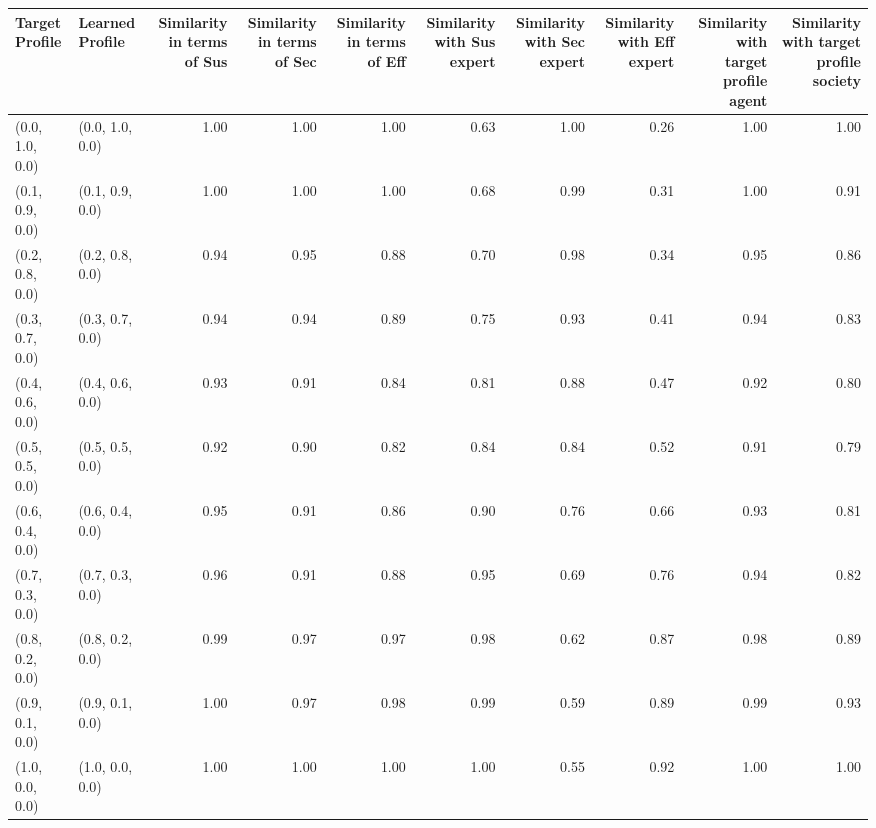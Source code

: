 \begin{tabular}{llrrrrrrrr}
\toprule
Target Profile & Learned Profile & Similarity in terms of Sus & Similarity in terms of Sec & Similarity in terms of Eff & Similarity with Sus expert & Similarity with Sec expert & Similarity with Eff expert & Similarity with target profile agent & Similarity with target profile society \\
\midrule
(0.0, 1.0, 0.0) & (0.0, 1.0, 0.0) & 1.00 & 1.00 & 1.00 & 0.63 & 1.00 & 0.26 & 1.00 & 1.00 \\
(0.1, 0.9, 0.0) & (0.1, 0.9, 0.0) & 1.00 & 1.00 & 1.00 & 0.68 & 0.99 & 0.31 & 1.00 & 0.91 \\
(0.2, 0.8, 0.0) & (0.2, 0.8, 0.0) & 0.94 & 0.95 & 0.88 & 0.70 & 0.98 & 0.34 & 0.95 & 0.86 \\
(0.3, 0.7, 0.0) & (0.3, 0.7, 0.0) & 0.94 & 0.94 & 0.89 & 0.75 & 0.93 & 0.41 & 0.94 & 0.83 \\
(0.4, 0.6, 0.0) & (0.4, 0.6, 0.0) & 0.93 & 0.91 & 0.84 & 0.81 & 0.88 & 0.47 & 0.92 & 0.80 \\
(0.5, 0.5, 0.0) & (0.5, 0.5, 0.0) & 0.92 & 0.90 & 0.82 & 0.84 & 0.84 & 0.52 & 0.91 & 0.79 \\
(0.6, 0.4, 0.0) & (0.6, 0.4, 0.0) & 0.95 & 0.91 & 0.86 & 0.90 & 0.76 & 0.66 & 0.93 & 0.81 \\
(0.7, 0.3, 0.0) & (0.7, 0.3, 0.0) & 0.96 & 0.91 & 0.88 & 0.95 & 0.69 & 0.76 & 0.94 & 0.82 \\
(0.8, 0.2, 0.0) & (0.8, 0.2, 0.0) & 0.99 & 0.97 & 0.97 & 0.98 & 0.62 & 0.87 & 0.98 & 0.89 \\
(0.9, 0.1, 0.0) & (0.9, 0.1, 0.0) & 1.00 & 0.97 & 0.98 & 0.99 & 0.59 & 0.89 & 0.99 & 0.93 \\
(1.0, 0.0, 0.0) & (1.0, 0.0, 0.0) & 1.00 & 1.00 & 1.00 & 1.00 & 0.55 & 0.92 & 1.00 & 1.00 \\
\bottomrule
\end{tabular}

